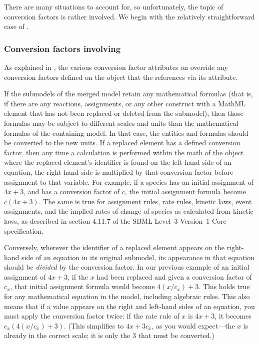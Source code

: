 There are many situations to account for, so unfortunately, the topic of
conversion factors is rather involved.  We begin with the relatively
straightforward case of \ReplacedElement.


\subsubsection{Conversion factors involving }

As explained in , the various conversion
factor attributes on \ReplacedElement override any conversion factors
defined on the \Submodel object that the \ReplacedElement references via
its  attribute.

If the submodels of the merged model retain any mathematical formulas
(that is, if there are any reactions, assignments, or any other
construct with a MathML  element that has not been
replaced or deleted from the submodel), then those formulas may be
subject to different scales and units than the mathematical formulas of
the containing model.  In that case, the entities and formulas should be
converted to the new units.  If a replaced element has a defined
conversion factor, then any time a calculation is performed within the
math of the \Submodel object where the replaced element's identifier is
found on the left-hand side of an equation, the right-hand side is
multiplied by that conversion factor before assignment to that variable.
For example, if a species has an initial assignment of $4x + 3$, and has
a conversion factor of $c$, the initial assignment formula become
$c (4x+3)$.  The same is true for assignment rules, rate
rules, kinetic laws, event assignments, and the implied rates of change
of species as calculated from kinetic laws, as described in section
4.11.7 of the SBML Level~3 Version~1 Core specification.

Conversely, wherever the identifier of a replaced element appears on the
right-hand side of an equation in its original submodel, its appearance
in that equation should be \emph{divided} by the conversion factor.  In
our previous example of an initial assignment of $4x+3$, if the $x$ had
been replaced and given a conversion factor of $c_x$, that initial
assignment formula would become $4(x/c_x)+3$.  This holds true for any
mathematical equation in the model, including algebraic rules.  This
also means that if a value appears on the right and left-hand sides of
an equation, you must apply the conversion factor twice: if the rate
rule of $x$ is $4x+3$, it becomes $c_x(4(x/c_x) + 3)$.  (This
simplifies to $4x + 3c_x$, as you would expect---the $x$ is already in
the correct scale; it is only the 3 that must be converted.)

